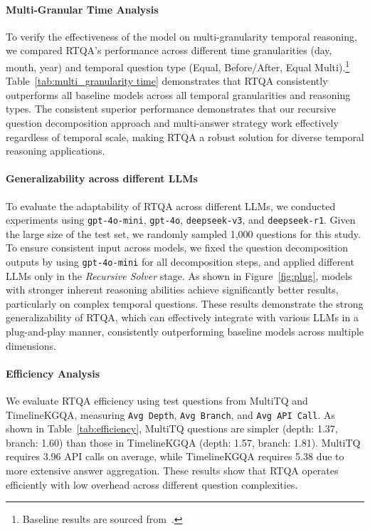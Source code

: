 \documentclass[11pt]{article}
\begin{document}
\paragraph{Multi-Granular Time Analysis}
To verify the effectiveness of the model on multi-granularity temporal reasoning, we compared RTQA's performance across different time granularities (day, month, year) and temporal question type (Equal, Before/After, Equal Multi).\footnote{\footnotesize Baseline results are sourced from~\cite{chen2023multi}.} 
Table~\ref{tab:multi_granularity time} demonstrates that RTQA consistently outperforms all baseline models across all temporal granularities and reasoning types. The consistent superior performance demonstrates that our recursive question decomposition approach and multi-answer strategy work effectively regardless of temporal scale, making RTQA a robust solution for diverse temporal reasoning applications.




\paragraph{Generalizability across different LLMs}
To evaluate the adaptability of RTQA across different LLMs, we conducted experiments using \texttt{gpt-4o-mini}, \texttt{gpt-4o}, \texttt{deepseek-v3}, and \texttt{deepseek-r1}. Given the large size of the test set, we randomly sampled 1,000 questions for this study. To ensure consistent input across models, we fixed the question decomposition outputs by using \texttt{gpt-4o-mini} for all decomposition steps, and applied different LLMs only in the \textit{Recursive Solver} stage. 
As shown in Figure~\ref{fig:plug}, models with stronger inherent reasoning abilities achieve significantly better results, particularly on complex temporal questions. These results demonstrate the strong generalizability of RTQA, which can effectively integrate with various LLMs in a plug-and-play manner, consistently outperforming baseline models across multiple dimensions.





\paragraph{Efficiency Analysis}
We evaluate RTQA efficiency using test questions from MultiTQ and TimelineKGQA, measuring \texttt{Avg Depth}, \texttt{Avg Branch}, and \texttt{Avg API Call}. As shown in Table~\ref{tab:efficiency}, MultiTQ questions are simpler (depth: 1.37, branch: 1.60) than those in TimelineKGQA (depth: 1.57, branch: 1.81). MultiTQ requires 3.96 API calls on average, while TimelineKGQA requires 5.38 due to more extensive answer aggregation. These results show that RTQA operates efficiently with low overhead across different question complexities.
\end{document}
